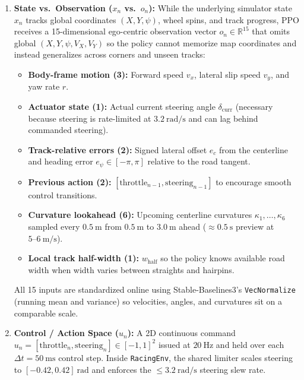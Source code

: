 \documentclass[12pt]{article}
\begin{document}
\begin{enumerate}[leftmargin=1.5em, itemsep=0.35em]
    \item \textbf{State vs.\ Observation ($x_n$ vs.\ $o_n$):} While the underlying simulator state $x_n$ tracks global coordinates $(X, Y, \psi)$, wheel spins, and track progress, PPO receives a 15-dimensional ego-centric observation vector $o_n \in \mathbb{R}^{15}$ that omits global $(X, Y, \psi, V_X, V_Y)$ so the policy cannot memorize map coordinates and instead generalizes across corners and unseen tracks:
    \begin{itemize}[leftmargin=1.5em, itemsep=0.15em]
        \item \textbf{Body-frame motion (3):} Forward speed $v_x$, lateral slip speed $v_y$, and yaw rate $r$.
        \item \textbf{Actuator state (1):} Actual current steering angle $\delta_{\text{curr}}$ (necessary because steering is rate-limited at $3.2~\text{rad/s}$ and can lag behind commanded steering).
        \item \textbf{Track-relative errors (2):} Signed lateral offset $e_c$ from the centerline and heading error $e_\psi \in [-\pi, \pi]$ relative to the road tangent.
        \item \textbf{Previous action (2):} $[\text{throttle}_{n-1}, \text{steering}_{n-1}]$ to encourage smooth control transitions.
        \item \textbf{Curvature lookahead (6):} Upcoming centerline curvatures $\kappa_1, \dots, \kappa_6$ sampled every $0.5~\text{m}$ from $0.5~\text{m}$ to $3.0~\text{m}$ ahead ($\approx 0.5~\text{s}$ preview at $5\text{--}6~\text{m/s}$).
        \item \textbf{Local track half-width (1):} $w_{\text{half}}$ so the policy knows available road width when width varies between straights and hairpins.
    \end{itemize}
    All 15 inputs are standardized online using Stable-Baselines3's \texttt{VecNormalize} (running mean and variance) so velocities, angles, and curvatures sit on a comparable scale.

    \item \textbf{Control / Action Space ($u_n$):} A 2D continuous command $u_n = [\text{throttle}_n, \text{steering}_n] \in [-1, 1]^2$ issued at $20~\text{Hz}$ and held over each $\Delta t = 50~\text{ms}$ control step. Inside \texttt{RacingEnv}, the shared limiter scales steering to $[-0.42, 0.42]~\text{rad}$ and enforces the $\le 3.2~\text{rad/s}$ steering slew rate.


\end{enumerate}
\end{document}
